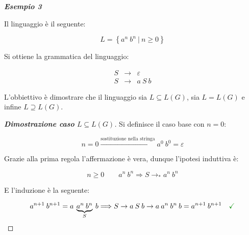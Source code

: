 \documentclass[a4paper]{article}
\begin{document}
	\newpage
	
	\noindent
	\textcolor{Green4}{\textbf{\emph{Esempio 3}}}
	
	\noindent
	Il linguaggio è il seguente:
	
	\begin{equation*}
		L = \left\{a^{n} \: b^{n} \: \left| \: n \ge 0 \right.\right\}
	\end{equation*}

	\noindent
	Si ottiene la grammatica del linguaggio:
	
	\begin{equation*}
		\begin{array}{lll}
			S & \longrightarrow & \varepsilon \\
			S & \longrightarrow & a \: S \: b
		\end{array}
	\end{equation*}
	
	\noindent
	L'obbiettivo è dimostrare che il linguaggio sia $L \subseteq L\left(G\right)$, sia $L = L\left(G\right)$ e infine $L \supseteq L\left(G\right)$.
	
	\begin{proof}[\textcolor{Blue3}{\textbf{Dimostrazione caso} $L \subseteq L\left(G\right)$}]
		Si definisce il caso base con $n = 0$:
		
		\begin{equation*}
			n = 0 \xrightarrow{\text{sostituzione nella stringa}} a^{0} \: b^{0} = \varepsilon
		\end{equation*}
	
		\noindent
		Grazie alla prima regola l'affermazione è vera, dunque l'ipotesi induttiva è:
		
		\begin{equation*}
			n \ge 0 \hspace{2em} a^{n} \: b^{n} \Longrightarrow S \longrightarrow_{*} a^{n} \: b^{n}
		\end{equation*}
	
		\noindent
		E l'induzione è la seguente:
		
		\begin{equation*}
			a^{n+1} \: b^{n+1} = a \: \underbrace{a^{n} \: b^{n}}_{S} \: b \Longrightarrow S \rightarrow a \: S \: b \rightarrow a \: a^{n} \: b^{n} \: b = a^{n+1} \: b^{n+1} \hspace{1em} \textcolor{Green4}{\textbf{\checkmark}}
		\end{equation*}
	\end{proof}
\end{document}
